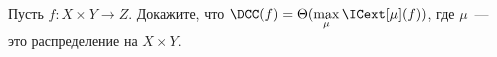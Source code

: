 Пусть $f\colon X \times Y \to Z$. Докажите, что $\DCC(f) = \Theta(\max\limits_{\mu} \ICext[\mu](f))$, где
$\mu$~--- это распределение на $X \times Y$.
